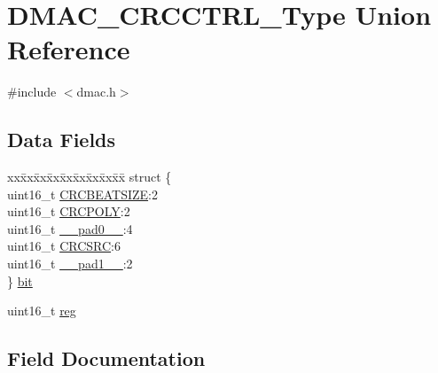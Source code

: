 \hypertarget{union_d_m_a_c___c_r_c_c_t_r_l___type}{}\section{D\+M\+A\+C\+\_\+\+C\+R\+C\+C\+T\+R\+L\+\_\+\+Type Union Reference}
\label{union_d_m_a_c___c_r_c_c_t_r_l___type}


{\ttfamily \#include $<$dmac.\+h$>$}

\subsection*{Data Fields}
\begin{DoxyCompactItemize}
\item 
\begin{tabbing}
xx\=xx\=xx\=xx\=xx\=xx\=xx\=xx\=xx\=\kill
struct \{\\
\>uint16\_t \mbox{\hyperlink{union_d_m_a_c___c_r_c_c_t_r_l___type_a1651eb4aea14d7179e6e448080003811}{CRCBEATSIZE}}:2\\
\>uint16\_t \mbox{\hyperlink{union_d_m_a_c___c_r_c_c_t_r_l___type_a23a0fc24c7e79886dd0e3accb4ef61bd}{CRCPOLY}}:2\\
\>uint16\_t \mbox{\hyperlink{union_d_m_a_c___c_r_c_c_t_r_l___type_a77132c2c26a75f5b8751b235cda23828}{\_\_pad0\_\_}}:4\\
\>uint16\_t \mbox{\hyperlink{union_d_m_a_c___c_r_c_c_t_r_l___type_abeeb55aaaf54e9bb28517d6341d2770f}{CRCSRC}}:6\\
\>uint16\_t \mbox{\hyperlink{union_d_m_a_c___c_r_c_c_t_r_l___type_ab72e3a1f2f7db8695c60c658f5a0f11a}{\_\_pad1\_\_}}:2\\
\} \mbox{\hyperlink{union_d_m_a_c___c_r_c_c_t_r_l___type_a1cf489bf5ca6baff681e060cc73b817a}{bit}}\\

\end{tabbing}\item 
uint16\+\_\+t \mbox{\hyperlink{union_d_m_a_c___c_r_c_c_t_r_l___type_a11760f5020019f4aa8cb02e694f7cc44}{reg}}
\end{DoxyCompactItemize}


\subsection{Field Documentation}
\mbox{\label{union_d_m_a_c___c_r_c_c_t_r_l___type_a77132c2c26a75f5b8751b235cda23828}} 
